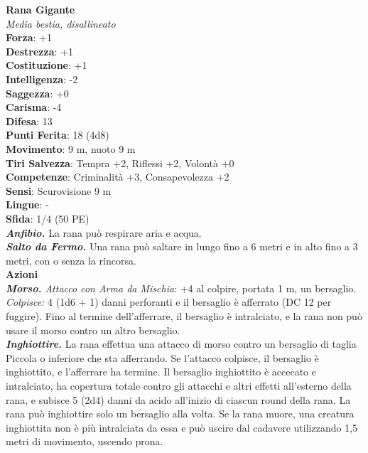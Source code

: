 \begin{multicols}{2}
\medskip\textbf{Rana Gigante}\\
\emph{Media bestia, disallineato}\\
\textbf{Forza}: +1\\
\textbf{Destrezza}: +1\\
\textbf{Costituzione}: +1\\
\textbf{Intelligenza}: -2\\
\textbf{Saggezza}: +0\\
\textbf{Carisma}: -4\\
\textbf{Difesa}: 13\\
\textbf{Punti Ferita}: 18 (4d8)\\
\textbf{Movimento}: 9 m, nuoto 9 m\\
\textbf{Tiri Salvezza}: Tempra +2, Riflessi +2, Volontà +0 \\
\textbf{Competenze}: Criminalità +3, Consapevolezza +2\\
\textbf{Sensi}: Scurovisione 9 m\\
\textbf{Lingue}: -\\
\textbf{Sfida}: 1/4 (50 PE)\smallskip\\
\emph{\textbf{Anfibio.}} La rana può respirare aria e acqua.\\
\emph{\textbf{Salto da Fermo.}} Una rana può saltare in lungo fino a 6 metri e in alto fino a 3 metri, con o senza la rincorsa.\\
\smallskip\textbf{Azioni}\\
\emph{\textbf{Morso.} Attacco con Arma da Mischia}: +4 al colpire, portata 1 m, un bersaglio.\\
\emph{Colpisce:} 4 (1d6 + 1) danni perforanti e il bersaglio è afferrato (DC  12 per fuggire). Fino al termine dell'afferrare, il bersaglio è intralciato, e la rana non può usare il morso contro un altro bersaglio.\\
\emph{\textbf{Inghiottire.}} La rana effettua una attacco di morso contro un bersaglio di taglia Piccola o inferiore che sta afferrando. Se l'attacco colpisce, il bersaglio è inghiottito, e l'afferrare ha termine. Il bersaglio inghiottito è accecato e intralciato, ha copertura totale contro gli attacchi e altri effetti all'esterno della rana, e subisce 5 (2d4) danni da acido all'inizio di ciascun round della rana. La rana può inghiottire solo un bersaglio alla volta. Se la rana muore, una creatura inghiottita non è più intralciata da essa e può uscire dal cadavere utilizzando 1,5 metri di movimento, uscendo prona.\\


\end{multicols}
